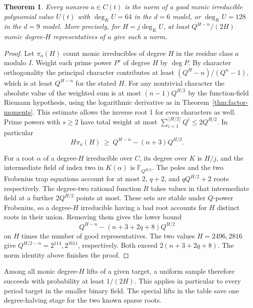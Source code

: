 \documentclass[11pt]{article}
\newtheorem{theorem}{Theorem}
\begin{document}
\begin{theorem}
Every nonzero \(a\in C(t)\) is the norm of a good monic irreducible
polynomial value \(U(t)\) with \(\deg_K U=64\) in the \(d=6\) model,
or \(\deg_K U=128\) in the \(d=9\) model. More precisely, for
\(H=j\deg_K U\), at least \(Q^{H-n}/(2H)\) monic degree-\(H\)
representatives of \(a\) give such a norm.
\end{theorem}
\begin{proof}
Let \(\pi_a(H)\) count monic irreducibles of degree \(H\) in the residue
class \(a\) modulo \(I\). Weight each prime power \(P^s\) of degree
\(H\) by \(\deg P\). By character orthogonality the principal character
contributes at least \((Q^H-n)/(Q^n-1)\), which is at least
\(Q^{H-n}\) for the stated \(H\). For any nontrivial character the
absolute value of the weighted sum is at most
\((n-1)Q^{H/2}\) by the function-field Riemann hypothesis, using the
logarithmic derivative as in Theorem~\ref{thm:factor-moments}.
This estimate allows the inverse root 1 for even characters as well.
Prime powers with \(s\ge2\) have total weight at most
\(\sum_{i=1}^{\lfloor H/2\rfloor}Q^i\le2Q^{H/2}\). In particular
\[
 H\pi_a(H)\ \ge\ Q^{H-n}-(n+3)Q^{H/2}.
\]

For a root \(\alpha\) of a degree-\(H\) irreducible over \(C\), its
degree over \(K\) is \(H/j\), and the intermediate field of index two
in \(K(\alpha)\) is \(\mathbb F_{Q^{H/2}}\). The poles and the two
Frobenius trap equations account for at most \(2\), \(q+2\), and
\(qQ^{H/2}+2\) roots respectively. The degree-two rational function
\(R\) takes values in that intermediate field at a further
\(2Q^{H/2}\) points at most. These sets are stable under \(Q\)-power
Frobenius, so a degree-\(H\) irreducible having a bad root accounts
for \(H\) distinct roots in their union. Removing them gives the lower
bound
\[
 Q^{H-n}-(n+3+2q+8)Q^{H/2}
\]
on \(H\) times the number of good representatives.
The two values \(H=2496,2816\) give
\(Q^{H/2-n}=2^{114},2^{1611}\), respectively. Both exceed
\(2(n+3+2q+8)\). The norm identity above finishes the proof.
\end{proof}
Among all monic degree-\(H\) lifts of a given target, a uniform sample
therefore succeeds with probability at least \(1/(2H)\). This applies
in particular to every period target in the smaller binary field. The
special lifts in the table save one degree-halving stage for the two
known sparse roots.
\end{document}
